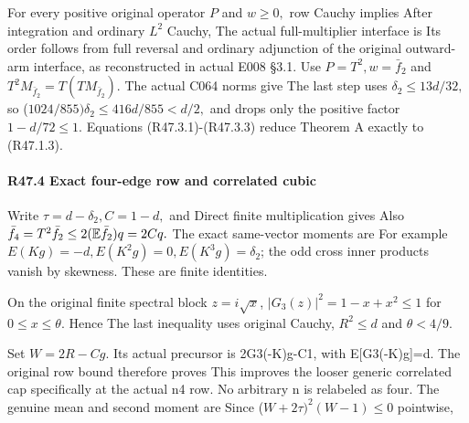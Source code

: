 For every positive original operator \(P\) and \(w\ge 0,\allowbreak \) row Cauchy implies
After integration and ordinary \(L^2\) Cauchy,
The actual full-multiplier interface is
Its order follows from full reversal and ordinary adjunction of the
original outward-arm interface, as reconstructed in actual E008 §3.1.
Use \(P=T^2,\allowbreak  w=\bar f_2\) and \(T^2M_{\bar f_2}=T(TM_{\bar f_2}).\) The actual C064 norms give
The last step uses \(\delta_2\le 13d/32,\allowbreak \) so (\(1024/855)\delta_2\le 416d/855<d/2,\allowbreak \)
and drops only the positive factor \(1-d/72\le 1.\)  Equations (R47.3.1)-(R47.3.3) reduce Theorem A exactly to (R47.1.3).

\paragraph{R47.4 Exact four-edge row and correlated cubic}

Write \(\tau=d-\delta_2,\allowbreak  C=1-d,\allowbreak \) and
Direct finite multiplication gives
Also \(\bar f_4=T^2\bar f_2\le 2(\mathbb E\bar f_2)q=2Cq.\) The exact same-vector moments are
For example \(E(Kg)=-d,\allowbreak  E(K^2g)=0,\allowbreak  E(K^3g)=\delta_2\); the odd cross
inner products vanish by skewness. These are finite identities.

On the original finite spectral block \(z=i \sqrt{x}\),
\(|G_{3}(z)|^2=1-x+x^2\le 1\) for \(0\le x\le \theta.\) Hence
The last inequality uses original Cauchy, \(R^2\le d\) and \(\theta<4/9.\)

Set \(W=2R-Cg.\) Its actual precursor is 2G3(-K)g-C1, with
E[G3(-K)g]=d. The original row bound therefore proves
This improves the looser generic correlated cap specifically at the
actual n4 row. No arbitrary n is relabeled as four.
The genuine mean and second moment are
Since (\(W+2\tau)^2(W-1)\le 0\) pointwise,

